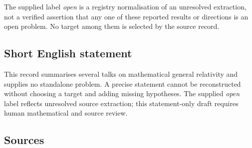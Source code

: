 \documentclass[11pt]{article}
\begin{document}
The supplied label \emph{open} is a registry normalisation of an unresolved extraction, not a verified assertion that any one of these reported results or directions is an open problem. No target among them is selected by the source record.
\subsection{Short English statement}
This record summarises several talks on mathematical general relativity and supplies no standalone problem. A precise statement cannot be reconstructed without choosing a target and adding missing hypotheses. The supplied \emph{open} label reflects unresolved source extraction; this statement-only draft requires human mathematical and source review.
\subsection{Sources}
\end{document}
